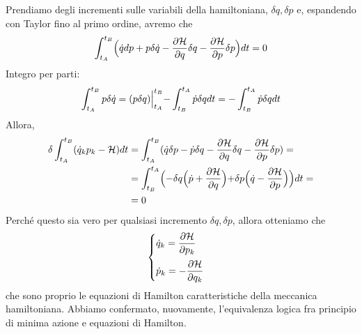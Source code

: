 \documentclass[a4paper,openany]{article}
\begin{document}
	Prendiamo degli incrementi sulle variabili della hamiltoniana, $\delta q, \delta p$ e, espandendo con Taylor fino al primo ordine, avremo che
	\begin{equation}\label{key}
		\int_{t_A}^{t_B}\Bigl(\dot{q}dp+p\delta \dot{q} - \dfrac{\partial \mathcal{
				H}}{\partial q}\delta q - \dfrac{\partial \mathcal{
				H}}{\partial p}\delta p\Bigl)dt = 0
	\end{equation}
	Integro per parti:
	\begin{equation}\label{key}
		\int_{t_A}^{t_B}p\delta\dot{q} = (p\delta q)\Bigl|^{t_B}_{t_A}- \int_{t_B}^{t_A}\dot{p}\delta q dt=-\int_{t_B}^{t_A}\dot{p}\delta q dt 
	\end{equation}
	Allora, 
	\begin{equation}\label{key}
		\begin{aligned}
			\delta \int_{t_A}^{t_B}(\dot{q}_k p_k-\mathcal{H}) dt &= \int_{t_A}^{t_B}(\dot{q}\delta p - \dot{p}\delta q - \dfrac{\partial \mathcal{
					H}}{\partial q}\delta q - \dfrac{\partial \mathcal{
					H}}{\partial p}\delta p) = \\
			&= \int_{t_B}^{t_A}\Bigl(-\delta q \Bigl(\dot{p}+\dfrac{\partial \mathcal{H}}{\partial q} \Bigl)+ \delta p \Bigl(\dot{q}-\dfrac{\partial \mathcal{H}}{\partial p}\Bigl)\Bigl)dt = 
			\\ &= 0
		\end{aligned}
	\end{equation}
	Perché questo sia vero per qualsiasi incremento $\delta q, \delta p$, allora otteniamo che 
	\begin{equation}
		\begin{cases}
			\dot{q}_k = \dfrac{\partial \mathcal{H}}{\partial p_k}\vspace{2mm}   \\
			
			\dot{p}_k = -\dfrac{\partial \mathcal{H}}{\partial q_k}
		\end{cases}
	\end{equation}
	che sono proprio le equazioni di Hamilton caratteristiche della meccanica hamiltoniana. Abbiamo confermato, nuovamente, l'equivalenza logica fra principio di minima azione e equazioni di Hamilton.
	
\end{document}

